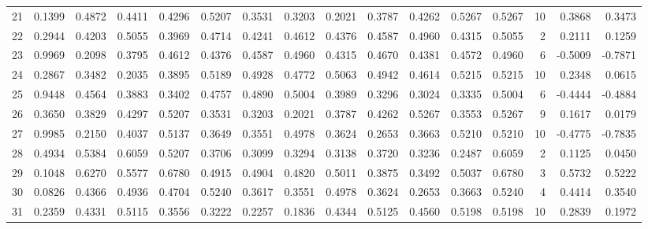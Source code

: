 \begin{tabular}{lrrrrrrrrrrrrrrr}
21  &      0.1399 &  0.4872 &  0.4411 &  0.4296 &  0.5207 &  0.3531 &  0.3203 &  0.2021 &  0.3787 &  0.4262 &   0.5267 &     0.5267 &     10 &                    0.3868 &                     0.3473 \\
22  &      0.2944 &  0.4203 &  0.5055 &  0.3969 &  0.4714 &  0.4241 &  0.4612 &  0.4376 &  0.4587 &  0.4960 &   0.4315 &     0.5055 &      2 &                    0.2111 &                     0.1259 \\
23  &      0.9969 &  0.2098 &  0.3795 &  0.4612 &  0.4376 &  0.4587 &  0.4960 &  0.4315 &  0.4670 &  0.4381 &   0.4572 &     0.4960 &      6 &                   -0.5009 &                    -0.7871 \\
24  &      0.2867 &  0.3482 &  0.2035 &  0.3895 &  0.5189 &  0.4928 &  0.4772 &  0.5063 &  0.4942 &  0.4614 &   0.5215 &     0.5215 &     10 &                    0.2348 &                     0.0615 \\
25  &      0.9448 &  0.4564 &  0.3883 &  0.3402 &  0.4757 &  0.4890 &  0.5004 &  0.3989 &  0.3296 &  0.3024 &   0.3335 &     0.5004 &      6 &                   -0.4444 &                    -0.4884 \\
26  &      0.3650 &  0.3829 &  0.4297 &  0.5207 &  0.3531 &  0.3203 &  0.2021 &  0.3787 &  0.4262 &  0.5267 &   0.3553 &     0.5267 &      9 &                    0.1617 &                     0.0179 \\
27  &      0.9985 &  0.2150 &  0.4037 &  0.5137 &  0.3649 &  0.3551 &  0.4978 &  0.3624 &  0.2653 &  0.3663 &   0.5210 &     0.5210 &     10 &                   -0.4775 &                    -0.7835 \\
28  &      0.4934 &  0.5384 &  0.6059 &  0.5207 &  0.3706 &  0.3099 &  0.3294 &  0.3138 &  0.3720 &  0.3236 &   0.2487 &     0.6059 &      2 &                    0.1125 &                     0.0450 \\
29  &      0.1048 &  0.6270 &  0.5577 &  0.6780 &  0.4915 &  0.4904 &  0.4820 &  0.5011 &  0.3875 &  0.3492 &   0.5037 &     0.6780 &      3 &                    0.5732 &                     0.5222 \\
30  &      0.0826 &  0.4366 &  0.4936 &  0.4704 &  0.5240 &  0.3617 &  0.3551 &  0.4978 &  0.3624 &  0.2653 &   0.3663 &     0.5240 &      4 &                    0.4414 &                     0.3540 \\
31  &      0.2359 &  0.4331 &  0.5115 &  0.3556 &  0.3222 &  0.2257 &  0.1836 &  0.4344 &  0.5125 &  0.4560 &   0.5198 &     0.5198 &     10 &                    0.2839 &                     0.1972 \\

\end{tabular}
